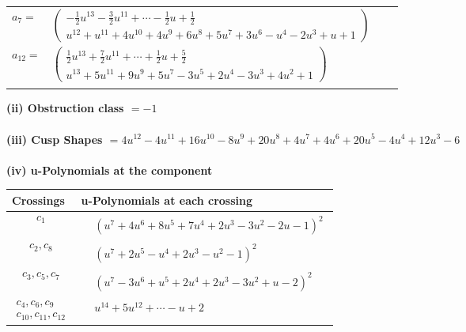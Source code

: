 \documentclass[1p]{elsarticle_modified}
\theoremstyle{definition}
\begin{document}
\begin{tabular}{m{7pt} m{180pt} m{7pt} m{180pt} }
\flushright $a_{7}=$&$\begin{pmatrix}-\frac{1}{2} u^{13}-\frac{3}{2} u^{11}+\cdots-\frac{1}{2} u+\frac{1}{2}\\u^{12}+u^{11}+4 u^{10}+4 u^9+6 u^8+5 u^7+3 u^6- u^4-2 u^3+u+1\end{pmatrix}$ \\
\flushright $a_{12}=$&$\begin{pmatrix}\frac{1}{2} u^{13}+\frac{7}{2} u^{11}+\cdots+\frac{1}{2} u+\frac{5}{2}\\u^{13}+5 u^{11}+9 u^9+5 u^7-3 u^5+2 u^4-3 u^3+4 u^2+1\end{pmatrix}$\\&\end{tabular}
\flushleft \textbf{(ii) Obstruction class $= -1$}\\~\\
\flushleft \textbf{(iii) Cusp Shapes $= 4 u^{12}-4 u^{11}+16 u^{10}-8 u^9+20 u^8+4 u^7+4 u^6+20 u^5-4 u^4+12 u^3-6$}\\~\\
\newpage\renewcommand{\arraystretch}{1}
\flushleft \textbf{(iv) u-Polynomials at the component}\newline \\
\begin{tabular}{m{50pt}|m{274pt}}
Crossings & \hspace{64pt}u-Polynomials at each crossing \\
\hline $$\begin{aligned}c_{1}\end{aligned}$$&$\begin{aligned}
&(u^7+4 u^6+8 u^5+7 u^4+2 u^3-3 u^2-2 u-1)^2
\end{aligned}$\\
\hline $$\begin{aligned}c_{2},c_{8}\end{aligned}$$&$\begin{aligned}
&(u^7+2 u^5- u^4+2 u^3- u^2-1)^2
\end{aligned}$\\
\hline $$\begin{aligned}c_{3},c_{5},c_{7}\end{aligned}$$&$\begin{aligned}
&(u^7-3 u^6+u^5+2 u^4+2 u^3-3 u^2+u-2)^2
\end{aligned}$\\
\hline $$\begin{aligned}c_{4},c_{6},c_{9}\\c_{10},c_{11},c_{12}\end{aligned}$$&$\begin{aligned}
&u^{14}+5 u^{12}+\cdots- u+2
\end{aligned}$\\
\hline
\end{tabular}\\~\\
\end{document}
